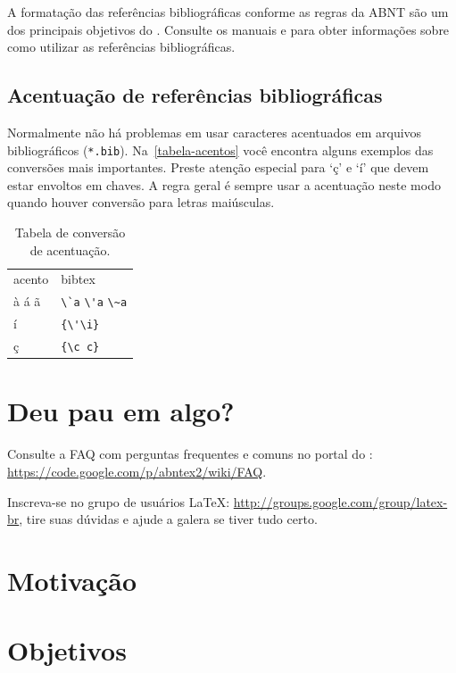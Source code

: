A formatação das referências bibliográficas conforme as regras da ABNT são um
dos principais objetivos do \abnTeX. Consulte os manuais
 e  para obter informações
sobre como utilizar as referências bibliográficas.

\subsection{Acentuação de referências bibliográficas}

Normalmente não há problemas em usar caracteres acentuados em arquivos
bibliográficos (\texttt{*.bib}). Na~\autoref{tabela-acentos} você encontra alguns exemplos das conversões mais importantes. Preste atenção especial para `ç' e `í'
que devem estar envoltos em chaves. A regra geral é sempre usar a acentuação
neste modo quando houver conversão para letras maiúsculas.

\begin{table}[htbp]
\caption{Tabela de conversão de acentuação.}
\label{tabela-acentos}

\begin{center}
\begin{tabular}{ll}\hline\hline
acento & \textsf{bibtex}\\
à á ã & \verb+\`a+ \verb+\'a+ \verb+\~a+\\
í & \verb+{\'\i}+\\
ç & \verb+{\c c}+\\
\hline\hline
\end{tabular}
\end{center}
\end{table}


\section{Deu pau em algo?}

Consulte a FAQ com perguntas frequentes e comuns no portal do \abnTeX:
\url{https://code.google.com/p/abntex2/wiki/FAQ}.

Inscreva-se no grupo de usuários \LaTeX:
\url{http://groups.google.com/group/latex-br}, tire suas dúvidas e ajude a galera se tiver tudo certo.

\section*{Motivação}\label{sec:motivacao}

\lipsum[35]

\section*{Objetivos}\label{sec:objetivos}

\lipsum[36]
